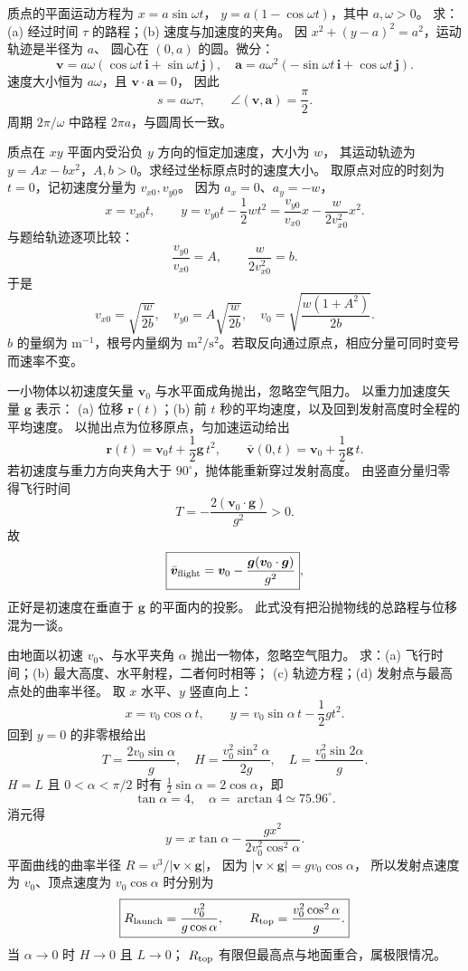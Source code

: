 质点的平面运动方程为 $x=a\sin\omega t$，
$y=a(1-\cos\omega t)$，其中 $a,\omega>0$。
求：(a) 经过时间 $\tau$ 的路程；(b) 速度与加速度的夹角。
\exsolution
因 $x^2+(y-a)^2=a^2$，运动轨迹是半径为 $a$、
圆心在 $(0,a)$ 的圆。微分：
\[
 \bm v=a\omega(\cos\omega t\,\bm i+\sin\omega t\,\bm j),\quad
 \bm a=a\omega^2(-\sin\omega t\,\bm i+\cos\omega t\,\bm j).
\]
速度大小恒为 $a\omega$，且 $\bm v\cdot\bm a=0$，
因此
\[
 \boxed{s=a\omega\tau,\qquad \angle(\bm v,\bm a)=\frac\pi2.}
\]
\excheck 周期 $2\pi/\omega$ 中路程 $2\pi a$，与圆周长一致。

质点在 $xy$ 平面内受沿负 $y$ 方向的恒定加速度，大小为 $w$，
其运动轨迹为 $y=Ax-bx^2$，$A,b>0$。求经过坐标原点时的速度大小。
\exsolution
取原点对应的时刻为 $t=0$，记初速度分量为 $v_{x0},v_{y0}$。
因为 $a_x=0$、$a_y=-w$，
\[
 x=v_{x0}t,\qquad y=v_{y0}t-\frac12wt^2
 =\frac{v_{y0}}{v_{x0}}x-\frac{w}{2v_{x0}^2}x^2.
\]
与题给轨迹逐项比较：
\[
 \frac{v_{y0}}{v_{x0}}=A,\qquad
 \frac{w}{2v_{x0}^2}=b.
\]
于是
\[
 \boxed{v_{x0}=\sqrt{\frac w{2b}},\quad
 v_{y0}=A\sqrt{\frac w{2b}},\quad
 v_0=\sqrt{\frac{w(1+A^2)}{2b}}.}
\]
\excheck $b$ 的量纲为 $\mathrm m^{-1}$，根号内量纲为
$\mathrm m^2/\mathrm s^2$。若取反向通过原点，相应分量可同时变号而速率不变。

一小物体以初速度矢量 $\bm v_0$ 与水平面成角抛出，忽略空气阻力。
以重力加速度矢量 $\bm g$ 表示：
(a) 位移 $\bm r(t)$；(b) 前 $t$ 秒的平均速度，以及回到发射高度时全程的平均速度。
\exsolution
以抛出点为位移原点，匀加速运动给出
\[
 \boxed{\bm r(t)=\bm v_0t+\frac12\bm g\,t^2,\qquad
 \bar{\bm v}(0,t)=\bm v_0+\frac12\bm g\,t.}
\]
若初速度与重力方向夹角大于 $90^\circ$，抛体能重新穿过发射高度。
由竖直分量归零得飞行时间
\[
 T=-\frac{2(\bm v_0\cdot\bm g)}{g^2}>0.
\]
故
\[
 \boxed{\bar{\bm v}_{\rm flight}=
 \bm v_0-\frac{\bm g(\bm v_0\cdot\bm g)}{g^2}},
\]
正好是初速度在垂直于 $\bm g$ 的平面内的投影。
\excheck 此式没有把沿抛物线的总路程与位移混为一谈。

由地面以初速 $v_0$、与水平夹角 $\alpha$ 抛出一物体，忽略空气阻力。
求：(a) 飞行时间；(b) 最大高度、水平射程，二者何时相等；
(c) 轨迹方程；(d) 发射点与最高点处的曲率半径。
\exsolution
取 $x$ 水平、$y$ 竖直向上：
\[
 x=v_0\cos\alpha\,t,\qquad
 y=v_0\sin\alpha\,t-\frac12gt^2.
\]
回到 $y=0$ 的非零根给出
\[
 \boxed{T=\frac{2v_0\sin\alpha}{g},\quad
 H=\frac{v_0^2\sin^2\alpha}{2g},\quad
 L=\frac{v_0^2\sin2\alpha}{g}.}
\]
$H=L$ 且 $0<\alpha<\pi/2$ 时有
$\frac12\sin\alpha=2\cos\alpha$，即
\[
 \boxed{\tan\alpha=4,\quad\alpha=\arctan4\simeq75.96^\circ.}
\]
消元得
\[
 \boxed{y=x\tan\alpha-
 \frac{gx^2}{2v_0^2\cos^2\alpha}}.
\]
平面曲线的曲率半径 $R=v^3/|\bm v\times\bm g|$，
因为 $|\bm v\times\bm g|=gv_0\cos\alpha$，
所以发射点速度为 $v_0$、顶点速度为 $v_0\cos\alpha$ 时分别为
\[
 \boxed{R_{\rm launch}=\frac{v_0^2}{g\cos\alpha},\qquad
 R_{\rm top}=\frac{v_0^2\cos^2\alpha}{g}.}
\]
\excheck 当 $\alpha\to0$ 时 $H\to0$ 且 $L\to0$；
$R_{\rm top}$ 有限但最高点与地面重合，属极限情况。

